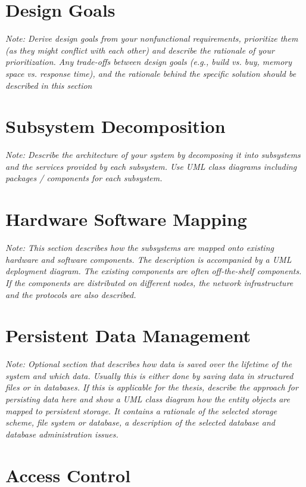 \documentclass[a4paper,12pt,twoside]{report}
\begin{document}
\section{Design Goals}

\textit{Note: Derive design goals from your nonfunctional requirements, prioritize them (as they might conflict with each other) and describe the rationale of your prioritization. Any trade-offs between design goals (e.g., build vs. buy, memory space vs. response time),
	and the rationale behind the specific solution should be described in this section}

\section{Subsystem Decomposition}

\textit{Note: Describe the architecture of your system by decomposing it into subsystems and the services provided by each subsystem. Use UML class diagrams including packages / components for each subsystem.}

\section{Hardware Software Mapping}

\textit{Note: This section describes how the subsystems are mapped onto existing hardware and software components. The description is accompanied by a UML deployment diagram. The existing components are often off-the-shelf components. If the components are distributed on different nodes, the network infrastructure and the protocols are also described.}

\section{Persistent Data Management}

\textit{Note: Optional section that describes how data is saved over the lifetime of the system and which data. Usually this is either done by saving data in structured files or in databases. If this is applicable for the thesis, describe the approach for persisting data here and show a UML class diagram how the entity objects are mapped to persistent storage.
	It contains a rationale of the selected storage scheme, file system or database, a description of the selected database and database administration issues.}

\section{Access Control}
\end{document}
